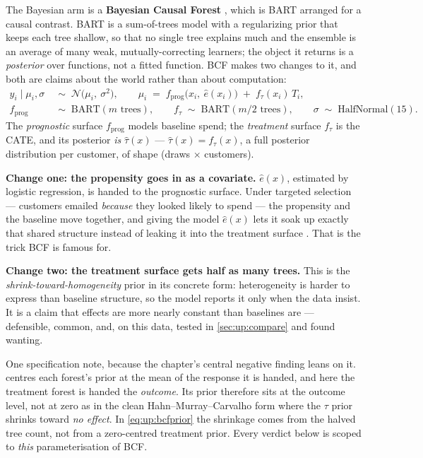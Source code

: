 The Bayesian arm is a \textbf{Bayesian Causal Forest} \citep{hahn2020}, which is BART
\citep{chipman2010, hill2011} arranged for a causal contrast. BART is a sum-of-trees model with
a regularizing prior that keeps each tree shallow, so that no single tree explains much and the
ensemble is an average of many weak, mutually-correcting learners; the object it returns is a
\emph{posterior} over functions, not a fitted function. BCF makes two changes to it, and both are
claims about the world rather than about computation:
%
\begin{align}
  y_i \;\big|\; \mu_i, \sigma
    &\;\sim\; \mathcal N\big(\mu_i,\ \sigma^{2}\big),
    \qquad
    \mu_i \;=\; f_{\text{prog}}\big(x_i,\ \hat e(x_i)\big) \;+\; f_{\tau}(x_i)\, T_i ,
    \label{eq:up:bcf}\\
  f_{\text{prog}} &\;\sim\; \text{BART}(m \text{ trees}),
  \qquad
  f_{\tau} \;\sim\; \text{BART}(m/2 \text{ trees}),
  \qquad
  \sigma \;\sim\; \text{HalfNormal}(15).
  \label{eq:up:bcfprior}
\end{align}
%
The \emph{prognostic} surface $f_{\text{prog}}$ models baseline spend; the \emph{treatment}
surface $f_{\tau}$ is the CATE, and its posterior \emph{is} $\hat\tau(x)$ ---
$\hat\tau(x) = f_\tau(x)$, a full posterior distribution per customer, of shape
(draws $\times$ customers).

\textbf{Change one: the propensity goes in as a covariate.} $\hat e(x)$, estimated by logistic
regression, is handed to the prognostic surface. Under targeted selection --- customers emailed
\emph{because} they looked likely to spend --- the propensity and the baseline move together, and
giving the model $\hat e(x)$ lets it soak up exactly that shared structure instead of leaking it
into the treatment surface \citep{hahn2020}. That is the trick BCF is famous for.

\textbf{Change two: the treatment surface gets half as many trees.} This is the
\emph{shrink-toward-homogeneity} prior in its concrete form: heterogeneity is harder to express
than baseline structure, so the model reports it only when the data insist. It is a claim that
effects are more nearly constant than baselines are --- defensible, common, and, on this data,
tested in \cref{sec:up:compare} and found wanting.

One specification note, because the chapter's central negative finding leans on it. 
centres each forest's prior at the mean of the response it is handed, and here the treatment forest is
handed the \emph{outcome}. Its prior therefore sits at the outcome level, not at zero as in the clean
Hahn--Murray--Carvalho form where the $\tau$ prior shrinks toward \emph{no effect}. In
\cref{eq:up:bcfprior} the shrinkage comes from the halved tree count, not from a zero-centred
treatment prior. Every verdict below is scoped to \emph{this} parameterisation of BCF.


